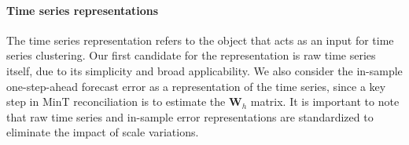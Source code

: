\documentclass[a4paper,review,12pt,authoryear]{elsarticle}
\begin{document}

\paragraph{\textbf{Time series representations}}


The time series representation refers to the object that acts as an input for time series clustering. %
Our first candidate for the representation is raw time series itself, due to its simplicity and broad applicability.
We also consider the in-sample one-step-ahead forecast error as a representation of the time series, since a key step in MinT reconciliation is to estimate the $\boldsymbol{W}_h$ matrix. %
It is important to note that raw time series and in-sample error representations are standardized to eliminate the impact of scale variations. %
\end{document}
